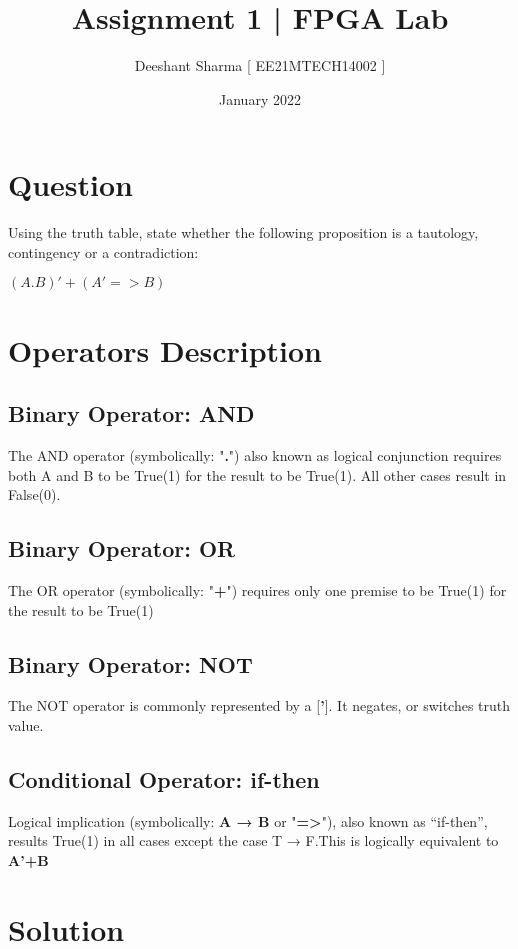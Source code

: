 \documentclass{article}
\title{\textbf{Assignment 1}  |\textbf{ FPGA Lab}}
\author{Deeshant Sharma [ EE21MTECH14002 ]}
\date{January 2022}
\begin{document}
\maketitle

\section{Question}

Using the truth table, state whether the following proposition is a tautology, contingency or a contradiction:
\begin{center}
    $ ( A . B )' + (  A' => B ) $
\end{center}

\section{Operators Description}
\subsection{Binary Operator: AND}
The AND operator (symbolically: "\textbf{.}") also known as logical conjunction requires both A and B to be True(1) for the result to be True(1). All other cases result in False(0).

\subsection{Binary Operator: OR}
The OR operator (symbolically: "\textbf{+}") requires only one premise to be True(1) for the result to be True(1)

\subsection{Binary Operator: NOT}
The NOT operator is commonly represented by a [\textbf{'}]. It negates, or switches truth value.

\subsection{Conditional Operator: if-then}
Logical implication (symbolically:\textbf{ A → B} or "\textbf{=>}"), also known as “if-then”, results True(1) in all cases except the case T → F.This is logically equivalent to \textbf{A'+B}

\section{Solution}
\end{document}
